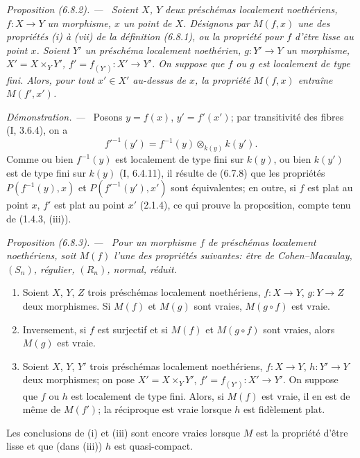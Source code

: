 \documentclass[10pt,oneside]{book}
\newenvironment{proposition}[1][]{%
  \par\medskip\noindent\itshape Proposition (#1). ---\ }{\par}
\newenvironment{proof}{%
  \par\medskip\noindent\textit{Démonstration. ---\ }}{\par}
\begin{document}
\begin{proposition}[6.8.2]
\label{IV.2.s6.8.2-fr}
Soient $X$, $Y$ deux préschémas localement noethériens, $f:X\to Y$ un
morphisme, $x$ un point de $X$. Désignons par $M(f,x)$ une des propriétés
(i) à (vii) de la définition (6.8.1), ou la propriété pour $f$ d'être lisse au
point $x$. Soient $Y'$ un préschéma localement noethérien, $g:Y'\to Y$ un
morphisme, $X'=X\times_Y Y'$, $f'=f_{(Y')}:X'\to Y'$. On suppose que $f$
ou $g$ est localement de type fini. Alors, pour tout $x'\in X'$ au-dessus de
$x$, la propriété $M(f,x)$ entraîne $M(f',x')$.
\end{proposition}

\begin{proof}
Posons $y=f(x)$, $y'=f'(x')$; par transitivité des fibres (I, 3.6.4), on a
\[
f'^{-1}(y')=f^{-1}(y)\otimes_{k(y)}k(y').
\]
Comme ou bien $f^{-1}(y)$ est localement de type fini sur $k(y)$, ou bien
$k(y')$ est de type fini sur $k(y)$ (I, 6.4.11), il résulte de (6.7.8) que
les propriétés $P(f^{-1}(y),x)$ et $P(f'^{-1}(y'),x')$ sont équivalentes; en
outre, si $f$ est plat au point $x$, $f'$ est plat au point $x'$ (2.1.4), ce
qui prouve la proposition, compte tenu de (1.4.3, (iii)).
\end{proof}

\begin{proposition}[6.8.3]
\label{IV.2.s6.8.3-fr}
Pour un morphisme $f$ de préschémas localement noethériens, soit $M(f)$
l'une des propriétés suivantes: être de Cohen--Macaulay, $(S_n)$, régulier,
$(R_n)$, normal, réduit.
\begin{enumerate}
\item[(i)] Soient $X$, $Y$, $Z$ trois préschémas localement noethériens,
$f:X\to Y$, $g:Y\to Z$ deux morphismes. Si $M(f)$ et $M(g)$ sont vraies,
$M(g\circ f)$ est vraie.
\item[(ii)] Inversement, si $f$ est surjectif et si $M(f)$ et $M(g\circ f)$
sont vraies, alors $M(g)$ est vraie.
\item[(iii)] Soient $X$, $Y$, $Y'$ trois préschémas localement noethériens,
$f:X\to Y$, $h:Y'\to Y$ deux morphismes; on pose $X'=X\times_Y Y'$,
$f'=f_{(Y')}:X'\to Y'$. On suppose que $f$ ou $h$ est localement de type
fini. Alors, si $M(f)$ est vraie, il en est de même de $M(f')$; la réciproque
est vraie lorsque $h$ est fidèlement plat.
\end{enumerate}
Les conclusions de (i) et (iii) sont encore vraies lorsque $M$ est la propriété
d'être lisse et que (dans (iii)) $h$ est quasi-compact.
\end{proposition}
\end{document}
